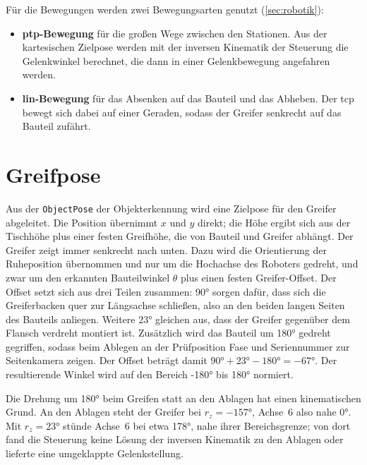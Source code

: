 Für die Bewegungen werden zwei Bewegungsarten genutzt (\cref{sec:robotik}):
\begin{itemize}
  \item \textbf{\ac{ptp}-Bewegung} für die großen Wege zwischen den Stationen. Aus der
        kartesischen Zielpose werden mit der inversen Kinematik der Steuerung die
        Gelenkwinkel berechnet, die dann in einer Gelenkbewegung angefahren werden.
  \item \textbf{\ac{lin}-Bewegung} für das Absenken auf das Bauteil und das Abheben. Der
        \ac{tcp} bewegt sich dabei auf einer Geraden, sodass der Greifer senkrecht auf das
        Bauteil zufährt.
\end{itemize}

\section{Greifpose}
\label{sec:m2-greifpose}

Aus der \texttt{ObjectPose} der Objekterkennung wird eine Zielpose für den Greifer
abgeleitet. Die Position übernimmt $x$ und $y$ direkt; die Höhe ergibt sich aus der
Tischhöhe plus einer festen Greifhöhe, die von Bauteil und Greifer abhängt. Der Greifer zeigt
immer senkrecht nach unten. Dazu wird die Orientierung der Ruheposition übernommen und nur um
die Hochachse des Roboters gedreht, und zwar um den erkannten Bauteilwinkel $\theta$ plus
einen festen Greifer-Offset. Der Offset setzt sich aus drei Teilen zusammen: \ang{90} sorgen
dafür, dass sich die Greiferbacken quer zur Längsachse schließen, also an den beiden langen
Seiten des Bauteils anliegen. Weitere \ang{23} gleichen aus, dass der Greifer gegenüber dem
Flansch verdreht montiert ist. Zusätzlich wird das Bauteil um \ang{180} gedreht gegriffen,
sodass beim Ablegen an der Prüfposition Fase und Seriennummer zur Seitenkamera zeigen. Der
Offset beträgt damit $\ang{90} + \ang{23} - \ang{180} = \ang{-67}$. Der resultierende Winkel
wird auf den Bereich \ang{-180} bis \ang{180} normiert.

Die Drehung um \ang{180} beim Greifen statt an den Ablagen hat einen kinematischen Grund. An
den Ablagen steht der Greifer bei $r_z = \ang{-157}$, Achse~6 also nahe \ang{0}. Mit
$r_z = \ang{23}$ stünde Achse~6 bei etwa \ang{178}, nahe ihrer Bereichsgrenze; von dort fand die
Steuerung keine Lösung der inversen Kinematik zu den Ablagen oder lieferte eine umgeklappte
Gelenkstellung.

